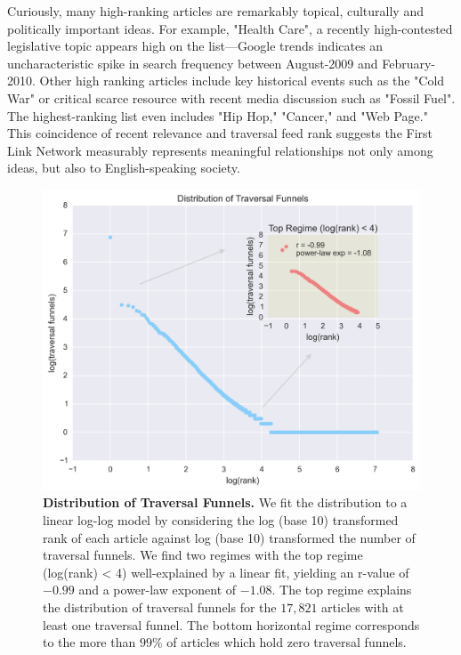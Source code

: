 \documentclass[pre,twocolumn,twoside,superscriptaddress,floatfix, aps, 10pt]{revtex4-1}
\begin{document}
Curiously, many high-ranking articles are remarkably topical, culturally and politically important ideas.  For example, "Health Care", a recently high-contested legislative topic appears high on the list---Google trends indicates an uncharacteristic spike in search frequency between August-2009 and February-2010.
Other high ranking articles include key historical events such as the "Cold War" or critical scarce resource with recent 
media discussion such as "Fossil Fuel". 
The highest-ranking list even includes "Hip Hop," "Cancer," and "Web Page."
This coincidence of recent relevance and traversal feed rank suggests the First Link Network measurably represents
meaningful relationships not only among ideas, but also to English-speaking society. 
\begin{figure}[tp!]
  \centering	
  \includegraphics[width=\columnwidth]{graphics/funnels_distribution.png}
  \caption{
    \textbf{Distribution of Traversal Funnels.}
  We fit the distribution to a linear log-log model by considering the log (base 10) transformed rank of each article against log (base 10) transformed the number of traversal funnels. 
  We find two regimes with the top regime (log(rank) < 4) 
  well-explained by a linear fit, yielding an r-value of $-0.99$ and a 
  power-law exponent of $-1.08$. The top regime 
  explains the distribution of traversal funnels for the $17, 821$ 
  articles with at least one traversal funnel. The bottom 
  horizontal regime corresponds to the more than $99\%$ of articles
  which hold zero traversal funnels.
  }
  \label{fig:Funnels Distribution}
\end{figure}
\end{document}
